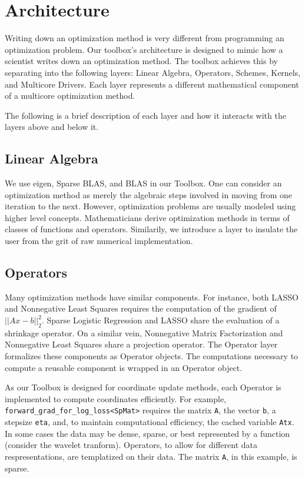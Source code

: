 \section{Architecture}

Writing down an optimization method is very different from programming an optimization problem.
Our toolbox's architecture is designed to mimic how a scientist writes down an optimization method.
The toolbox achieves this by separating into the following layers: Linear Algebra, Operators, Schemes, Kernels, and Multicore Drivers.
Each layer represents a different mathematical component of a multicore optimization method. 

The following is a brief description of each layer and how it interacts with the layers above and below it.

\subsection{Linear Algebra}

We use eigen, Sparse BLAS, and BLAS in our Toolbox.
One can consider an optimization method as merely the algebraic steps involved in moving from one iteration to the next.
However, optimization problems are usually modeled using higher level concepts.
Mathematicians derive optimization methods in terms of classes of functions and operators.
Similarily, we introduce a layer to insulate the user from the grit of raw numerical implementation. 

\subsection{Operators}

Many optimization methods have similar components.
For instance, both LASSO and Nonnegative Least Squares requires the computation of the gradient of $||Ax-b||_2^2$.
Sparse Logistic Regression and LASSO share the evaluation of a shrinkage operator.
On a similar vein, Nonnegative Matrix Factorization and Nonnegative Least Squares share a projection operator.
The Operator layer formalizes these components as Operator objects.
The computations necessary to compute a reusable component is wrapped in an Operator object.


As our Toolbox is designed for coordinate update methods, each Operator is implemented to compute coordinates efficiently. For example, \texttt{forward\_grad\_for\_log\_loss<SpMat>} requires the matrix \texttt{A}, the vector \texttt{b}, a stepsize \texttt{eta},  and, to maintain computational efficiency, the cached variable \texttt{Atx}.
In some cases the data may be dense, sparse, or best represented by a function (consider the wavelet tranform).
Operators, to allow for different data respresentations, are templatized on their data.
The matrix \texttt{A}, in this example, is sparse.


